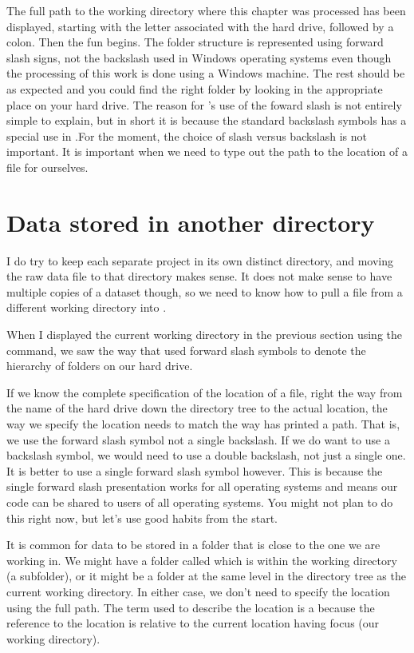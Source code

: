 The full path to the working directory where this chapter was processed has been displayed, starting with the letter associated with the hard drive, followed by a colon. Then the fun begins. The folder structure is represented using forward slash signs, not the backslash used in Windows operating systems even though the processing of this work is done using a Windows machine. The rest should be as expected and you could find the right folder by looking in the appropriate place on your hard drive. The reason for \R{}'s use of the foward slash is not entirely simple to explain, but in short it is because the standard backslash symbols has a special use  in \R{}.For the moment, the choice of slash versus backslash is not important. It is important when we need to type out the path to the location of a file for ourselves.



\section{Data stored in another directory}


I do try to keep each separate project in its own distinct directory, and moving the raw data file to that directory makes sense. It does not make sense to have multiple copies of a dataset though, so we need to know how to pull a file from a different working directory into \R{}.

When I displayed the current working directory in the previous section using the  command, we saw the way that \R{} used forward slash symbols to denote the hierarchy of folders on our hard drive.

If we know the complete specification of the location of a file, right the way from the name of the hard drive down the directory tree to the actual location, the way we specify the location needs to match the way \R{} has printed a path. That is, we use the forward slash symbol not a single backslash. If we do want to use a backslash symbol, we would need to use a double backslash, not just a single one. It is better to use a single forward slash symbol however. This is because the single forward slash presentation works for all operating systems and means our code can be shared to users of all operating systems. You might not plan to do this right now, but let's use good habits from the start.

It is common for data to be stored in a folder that is close to the one we are working in. We might have a folder called  which is within the working directory (a subfolder), or it might be a folder at the same level in the directory tree as the current working directory. In either case, we don't need to specify the location using the full path. The term used to describe the location is a  because the reference to the location is relative to the current location having focus (our working directory). 

